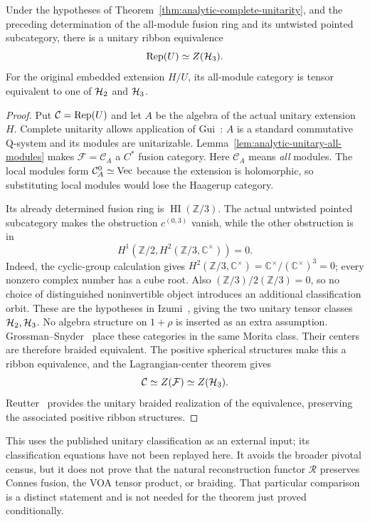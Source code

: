 \begin{theorem}
\label{thm:analytic-category}
Under the hypotheses of Theorem~\ref{thm:analytic-complete-unitarity},
and the preceding determination of the all-module fusion ring and its
untwisted pointed subcategory, there is a unitary ribbon equivalence
\[
 \Rep(U)\simeq Z(\HH_3).
\]
For the original embedded extension $H/U$, its all-module category is
tensor equivalent to one of $\HH_2$ and $\HH_3$.
\end{theorem}
\begin{proof}
Put $\mathcal C=\Rep(U)$ and let $A$ be the algebra of the actual
unitary extension $H$.  Complete unitarity allows application of
Gui~\cite[Theorems~2.21 and~2.28]{Gui}: $A$ is a standard commutative
Q-system and its modules are unitarizable.
Lemma~\ref{lem:analytic-unitary-all-modules} makes
$\mathcal F=\mathcal C_A$ a $C^*$ fusion category.  Here $\mathcal C_A$ means
\emph{all} modules.  The local modules form $\mathcal C_A^0\simeq\Vec$
because the extension is holomorphic, so substituting local modules
would lose the Haagerup category.

Its already determined fusion ring is
$\operatorname{HI}(\mathbb Z/3)$.  The actual untwisted pointed
subcategory makes the obstruction $c^{(0,3)}$ vanish, while the other
obstruction is in
\[
 H^1\!\left(\mathbb Z/2,H^2(\mathbb Z/3,\mathbb C^\times)\right)=0.
\]
Indeed, the cyclic-group calculation gives
$H^2(\mathbb Z/3,\mathbb C^\times)=
\mathbb C^\times/(\mathbb C^\times)^3=0$;
every nonzero complex number has a cube root.  Also
$(\mathbb Z/3)/2(\mathbb Z/3)=0$, so no choice of distinguished
noninvertible object introduces an additional classification orbit.
These are the hypotheses in
Izumi~\cite[Definition~2.7 and Theorems~5.9 and~9.1]{Izumi}, giving the two
unitary tensor classes $\HH_2,\HH_3$.  No algebra structure on
$1+\rho$ is inserted as an extra assumption.
Grossman--Snyder~\cite[Theorem~1.4]{GS} place these categories in the same
Morita class.  Their centers are therefore braided equivalent.
The positive spherical structures make this a ribbon equivalence, and
the Lagrangian-center theorem gives
\[
 \mathcal C\simeq Z(\mathcal F)\simeq Z(\HH_3).
\]
Reutter~\cite[Theorem~5]{Reutter} provides the unitary braided realization of the
equivalence, preserving the associated positive ribbon structures.
\end{proof}

This uses the published unitary classification as an external input;
its classification equations have not been replayed here.  It avoids
the broader pivotal census, but it does not prove that the natural
reconstruction functor $\mathcal R$ preserves Connes fusion, the VOA
tensor product, or braiding.  That particular comparison is a distinct
statement and is not needed for the theorem just proved conditionally.


